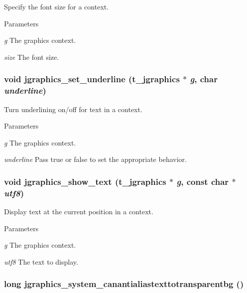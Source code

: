 Specify the font size for a context. 
\begin{DoxyParams}{Parameters}
\item[{\em g}]The graphics context. \item[{\em size}]The font size. \end{DoxyParams}
\hypertarget{group__jgraphics_ga6753504ad26f256016c34681672d3478}{
\subsubsection[{jgraphics\_\-set\_\-underline}]{\setlength{\rightskip}{0pt plus 5cm}void jgraphics\_\-set\_\-underline ({\bf t\_\-jgraphics} $\ast$ {\em g}, \/  char {\em underline})}}
\label{group__jgraphics_ga6753504ad26f256016c34681672d3478}


Turn underlining on/off for text in a context. 
\begin{DoxyParams}{Parameters}
\item[{\em g}]The graphics context. \item[{\em underline}]Pass true or false to set the appropriate behavior. \end{DoxyParams}
\hypertarget{group__jgraphics_ga91b780fe7e636c4497d0f8ab0ebfd41e}{
\subsubsection[{jgraphics\_\-show\_\-text}]{\setlength{\rightskip}{0pt plus 5cm}void jgraphics\_\-show\_\-text ({\bf t\_\-jgraphics} $\ast$ {\em g}, \/  const char $\ast$ {\em utf8})}}
\label{group__jgraphics_ga91b780fe7e636c4497d0f8ab0ebfd41e}


Display text at the current position in a context. 
\begin{DoxyParams}{Parameters}
\item[{\em g}]The graphics context. \item[{\em utf8}]The text to display. \end{DoxyParams}
\hypertarget{group__jgraphics_gaf794cabf13ac57d40f311bb415426925}{
\subsubsection[{jgraphics\_\-system\_\-canantialiastexttotransparentbg}]{\setlength{\rightskip}{0pt plus 5cm}long jgraphics\_\-system\_\-canantialiastexttotransparentbg ()}}
\label{group__jgraphics_gaf794cabf13ac57d40f311bb415426925}


